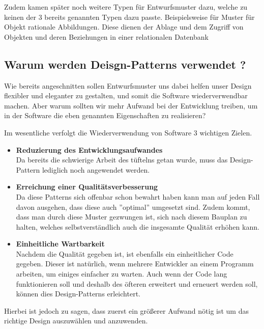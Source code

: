 	Zudem kamen später noch weitere Typen für Entwurfsmuster dazu, welche zu keinen der 3 bereits genannten Typen dazu passte. Beispielsweise für Muster für Objekt rationale Abbildungen.
	Diese dienen der Ablage und dem Zugriff von Objekten und deren Beziehungen in einer relationalen Datenbank


\clearpage


	\subsection{Warum werden Deisgn-Patterns verwendet ?}
	Wie bereits angeschnitten sollen Entwurfsmuster uns dabei helfen unser Design flexibler und eleganter zu gestalten, und somit die Software wiederverwendbar machen. Aber warum sollten wir mehr Aufwand bei der Entwicklung treiben, um in der Software die eben
	genannten Eigenschaften zu realisieren?
	
	Im wesentliche verfolgt die Wiederverwendung von Software 3 wichtigen Zielen.
	
	\begin{itemize}
		\item[\Checkmark] \textbf{Reduzierung des Entwicklungsaufwandes}\\
		Da bereits die schwierige Arbeit des tüftelns getan wurde, muss das Design-Pattern lediglich noch angewendet werden.\cite{pdf1}
		
		\item[\Checkmark] \textbf{Erreichung einer Qualitätsverbesserung}\\
		Da diese Patterns sich offenbar schon bewahrt haben kann man auf jeden Fall davon ausgehen, dass diese auch ''optimal'' umgesetzt sind. Zudem kommt, dass man durch diese Muster gezwungen ist, sich nach diesem Bauplan zu halten, welches selbstverständlich auch die insgesamte Qualität erhöhen kann.
		
		\item[\Checkmark] \textbf{Einheitliche Wartbarkeit}\\
		Nachdem die Qualität gegeben ist, ist ebenfalls ein einheitlicher Code gegeben. Dieser ist natürlich, wenn mehrere Entwickler an einem Programm arbeiten, um einiges einfacher zu warten. Auch wenn der Code lang funktionieren soll und deshalb des öfteren erweitert und erneuert werden soll, können dies Design-Patterns erleichtert. \cite{pdf1}
	\end{itemize}
	
	Hierbei ist jedoch zu sagen, dass zuerst ein größerer Aufwand nötig ist um das richtige Design auszuwählen und anzuwenden.
	
